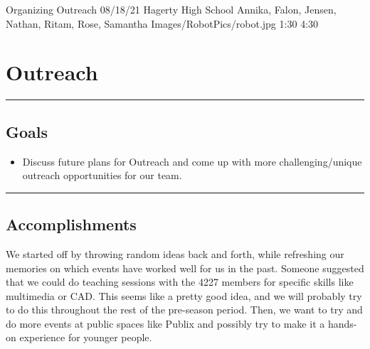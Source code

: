 \insertmeeting 
	{Organizing Outreach} 
	{08/18/21}
	{Hagerty High School}
	{Annika, Falon, Jensen, Nathan, Ritam, Rose, Samantha}
	{Images/RobotPics/robot.jpg}
	{1:30}
  {4:30}
	
\section*{Outreach}
\noindent\hfil\rule{\textwidth}{.4pt}\hfil
\subsection*{Goals}
\begin{itemize}
    \item Discuss future plans for Outreach and come up with more challenging/unique outreach opportunities for our team.  

\end{itemize} 

\noindent\hfil\rule{\textwidth}{.4pt}\hfil

\subsection*{Accomplishments}
We started off by throwing random ideas back and forth, while refreshing our memories on which events have worked well for us in the past. Someone suggested that we could do teaching sessions with the 4227 members for specific skills like multimedia or CAD. This seems like a pretty good idea, and we will probably try to do this throughout the rest of the pre-season period. Then, we want to try and do more events at public spaces like Publix and possibly try to make it a hands-on experience for younger people.

